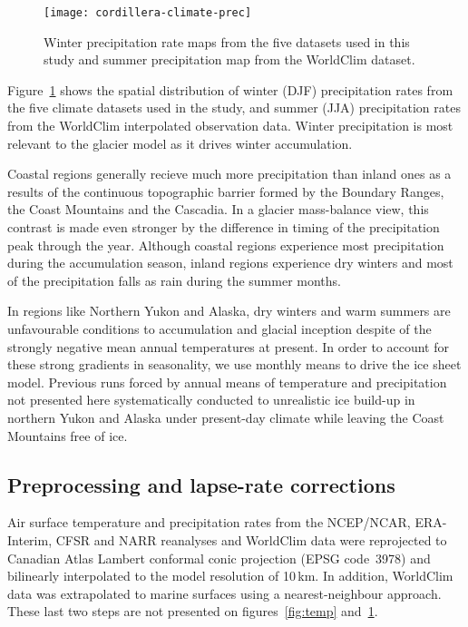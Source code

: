 \begin{figure}[t]
	\vspace*{2mm}
	\begin{center}
		\texttt{[image: cordillera-climate-prec]}
	\end{center}
	\caption{Winter precipitation rate maps from the five datasets used in this study and summer precipitation map from the WorldClim dataset.}
	\label{fig:prec}
\end{figure}

Figure~\ref{fig:prec} shows the spatial distribution of winter (DJF) precipitation rates from the five climate datasets used in the study, and summer (JJA) precipitation rates from the WorldClim interpolated observation data. Winter precipitation is most relevant to the glacier model as it drives winter accumulation.

Coastal regions generally recieve much more precipitation than inland ones as a results of the continuous topographic barrier formed by the Boundary Ranges, the Coast Mountains and the Cascadia. In a glacier mass-balance view, this contrast is made even stronger by the difference in timing of the precipitation peak through the year. Although coastal regions experience most precipitation during the accumulation season, inland regions experience dry winters and most of the precipitation falls as rain during the summer months.

In regions like Northern Yukon and Alaska, dry winters and warm summers are unfavourable conditions to accumulation and glacial inception despite of the strongly negative mean annual temperatures at present. In order to account for these strong gradients in seasonality, we use monthly means to drive the ice sheet model. Previous runs forced by annual means of temperature and precipitation not presented here systematically conducted to unrealistic ice build-up in northern Yukon and Alaska under present-day climate while leaving the Coast Mountains free of ice.


\subsection{Preprocessing and lapse-rate corrections}

Air surface temperature and precipitation rates from the NCEP/NCAR, ERA-Interim, CFSR and NARR reanalyses and WorldClim data were reprojected to Canadian Atlas Lambert conformal conic projection (EPSG code~3978) and bilinearly interpolated to the model resolution of 10\,km. In addition, WorldClim data was extrapolated to marine surfaces using a nearest-neighbour approach. These last two steps are not presented on figures~\ref{fig:temp} and~\ref{fig:prec}.

